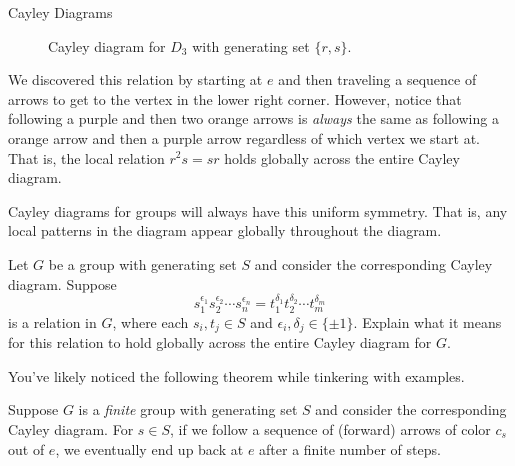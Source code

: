\begin{section}{Cayley Diagrams}
\begin{figure}
\centering
{}
\caption{Cayley diagram for $D_3$ with generating set $\{r,s\}$.}\label{fig:D3}
\end{figure}

We discovered this relation by starting at $e$ and then traveling a sequence of arrows to get to the vertex in the lower right corner.  However, notice that following a {\color{cb-purple}purple} and then two {\color{cb-orange}orange}  arrows is \emph{always} the same as following a {\color{cb-orange}orange}  arrow and then a {\color{cb-purple}purple} arrow regardless of which vertex we start at.  That is, the local relation $r^2s=sr$ holds globally across the entire Cayley diagram.

Cayley diagrams for groups will always have this uniform symmetry. That is, any local patterns in the diagram appear globally throughout the diagram. 

\begin{problem}
Let $G$ be a group with generating set $S$ and consider the corresponding Cayley diagram. Suppose
\[
s_{1}^{\epsilon_1}s_{2}^{\epsilon_2}\cdots s_{n}^{\epsilon_n}=t_{1}^{\delta_1}t_{2}^{\delta_2}\cdots t_{m}^{\delta_m}
\]
is a relation in $G$, where each $s_{i},t_{j}\in S$ and $\epsilon_i,\delta_j\in\{\pm 1\}$.  Explain what it means for this relation to hold globally across the entire Cayley diagram for $G$.
\end{problem}

You've likely noticed the following theorem while tinkering with examples.

\begin{theorem}
Suppose $G$ is a \emph{finite} group with generating set $S$ and consider the corresponding Cayley diagram. For $s\in S$, if we follow a sequence of (forward) arrows of color $c_s$ out of $e$, we eventually end up back at $e$ after a finite number of steps.
\end{theorem}


\end{section}
